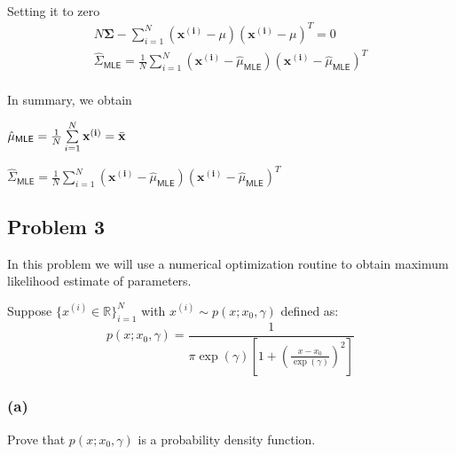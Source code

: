 \documentclass[11pt]{article}
\begin{document}
{\ \\
Setting it to zero
\begin{gather*}
	 	N\mathbf{\Sigma} - \sum\limits_{i=1}^N (\mathbf{x^{(i)}}-\mu)(\mathbf{x^{(i)}}-\mu)^T =0\\
	 	\hat{\Sigma}_{\mathsf{MLE}}= \frac{1}{N}\sum\limits_{i=1}^N (\mathbf{x^{(i)}}-\hat{\mu}_{\mathsf{MLE}})(\mathbf{x^{(i)}}-\hat{\mu}_{\mathsf{MLE}})^T
\end{gather*}
\ \\
In summary, we obtain 

$\hat{\mu}_{\mathsf{MLE}} = \frac{1}{N} \sum
\limits_{i=1}^N \mathbf{x^{(i)}} = \Bar{\mathbf{x}}$

$\hat{\Sigma}_{\mathsf{MLE}} = \frac{1}{N}\sum\limits_{i=1}^N (\mathbf{x^{(i)}}-\hat{\mu}_{\mathsf{MLE}})(\mathbf{x^{(i)}}-\hat{\mu}_{\mathsf{MLE}})^T$
}
\vfill
\clearpage

\subsection*{Problem 3}

In this problem we will use a numerical optimization routine to obtain maximum likelihood estimate
of parameters.

Suppose $\{ x^{(i) }\in \mathbb{R} \}_{i = 1}^N$ with $x^{(i)} \sim p(x ; x_0, \gamma)$
defined as:
$$p( x ; x_0, \gamma )= \frac{1}{\pi\exp( \gamma) \left [ 
	1 + \left( \frac{x - x_0}{\exp(\gamma)} \right)^2 \right ]}  $$


	\label{question:cauchy}
	\subsubsection*{(a)}
	Prove that $p( x ; x_0, \gamma )$ is a probability density function.
	
\end{document}
